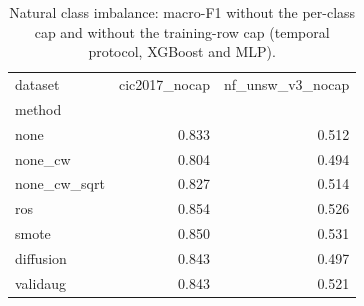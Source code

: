 \begin{table}[t]
\centering\small
\caption{Natural class imbalance: macro-F1 without the per-class cap and without the training-row cap (temporal protocol, XGBoost and MLP).}
\label{tab:nocap}
\begin{tabular}{lrr}
\toprule
dataset & cic2017\_nocap & nf\_unsw\_v3\_nocap \\
method &  &  \\
\midrule
none & 0.833 & 0.512 \\
none\_cw & 0.804 & 0.494 \\
none\_cw\_sqrt & 0.827 & 0.514 \\
ros & 0.854 & 0.526 \\
smote & 0.850 & 0.531 \\
diffusion & 0.843 & 0.497 \\
validaug & 0.843 & 0.521 \\
\bottomrule
\end{tabular}
\end{table}
